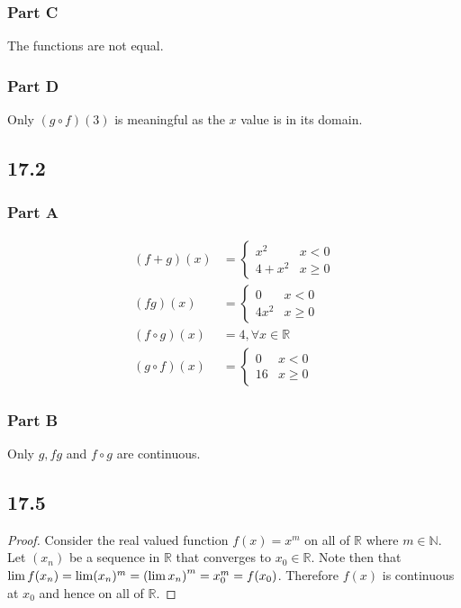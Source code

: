 \documentclass[12pt,titlepage]{extarticle}
\begin{document}
\subsubsection*{Part C}
The functions are not equal.

\subsubsection*{Part D}
Only $(g\circ f)(3)$ is meaningful as the $x$ value is in its domain.

\subsection*{17.2}
\subsubsection*{Part A}
\begin{align*}
    (f+g)(x) &= \begin{cases}
        x^2 & x < 0 \\
        4 + x^2 & x \geq 0
    \end{cases} \\
    (fg)(x) &= \begin{cases}
        0 & x < 0 \\
        4x^2 & x \geq 0
    \end{cases} \\
    (f \circ g)(x) &= 4, \forall x \in \mathbb{R} \\
    (g\circ f)(x) &= \begin{cases}
        0 & x < 0 \\
        16 & x \geq 0
    \end{cases}
\end{align*}

\subsubsection*{Part B}
Only $g, fg$ and $f \circ g$ are continuous.

\subsection*{17.5}
\begin{proof}
    Consider the real valued function $f(x) = x^m$ on all of $\mathbb{R}$ where $m \in \mathbb{N}$. Let $(x_n)$ be a sequence in $\mathbb{R}$ that converges to $x_0 \in \mathbb{R}$. Note then that $\lim f(x_n) = \lim (x_n)^m = \qty(\lim x_n)^m = x_0^m = f(x_0)$. Therefore $f(x)$ is continuous at $x_0$ and hence on all of $\mathbb{R}$.
\end{proof}
\end{document}
